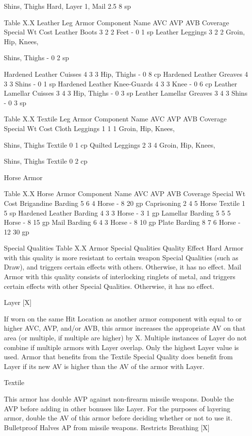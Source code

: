 \documentclass[oneside,11pt,english]{book}
\begin{document}
Shins, Thighs Hard, Layer 1, Mail 2.5 8 sp

Table X.X Leather Leg Armor
Component Name AVC AVP AVB Coverage Special Wt Cost
Leather Boots 3 2 2 Feet - 0 1 sp
Leather Leggings 3 2 2 Groin, Hip, Knees, 

Shins, Thighs - 0 2 sp

Hardened Leather 
Cuisses 4 3 3 Hip, Thighs - 0 8 cp
Hardened Leather 
Greaves 4 3 3 Shins - 0 1 sp
Hardened Leather 
Knee-Guards 4 3 3 Knee - 0 6 cp
Leather Lamellar 
Cuisses 3 4 3 Hip, Thighs - 0 3 sp
Leather Lamellar 
Greaves 3 4 3 Shins - 0 3 sp

Table X.X Textile Leg Armor
Component Name AVC AVP AVB Coverage Special Wt Cost
Cloth Leggings 1 1 1 Groin, Hip, Knees, 

Shins, Thighs Textile 0 1 cp
Quilted Leggings 2 3 4 Groin, Hip, Knees, 

Shins, Thighs Textile 0 2 cp

Horse Armor


Table X.X Horse Armor
Component Name AVC AVP AVB Coverage Special Wt Cost
Brigandine 
Barding 5 6 4 Horse - 8 20 gp
Caprisoning 2 4 5 Horse Textile 1 5 sp
Hardened Leather 
Barding 4 3 3 Horse - 3 1 gp
Lamellar Barding 5 5 5 Horse - 8 15 gp
Mail Barding 6 4 3 Horse - 8 10 gp
Plate Barding 8 7 6 Horse - 12 30 gp

Special Qualities
Table X.X Armor Special Qualities
Quality Effect
Hard Armor with this quality is more resistant to certain weapon Special Qualities (such as Draw), and 
triggers certain effects with others. Otherwise, it has no effect.
Mail Armor with this quality consists of interlocking ringlets of metal, and triggers certain effects with 
other Special Qualities. Otherwise, it has no effect.

Layer [X]

If worn on the same Hit Location as another armor component with equal to or higher AVC, AVP, 
and/or AVB, this armor increases the appropriate AV on that area (or multiple, if multiple are 
higher) by X. Multiple instances of Layer do not combine if multiple armors with Layer overlap. 
Only the highest Layer value is used. Armor that benefits from the Textile Special Quality does 
benefit from Layer if its new AV is higher than the AV of the armor with Layer.

Textile

This armor has double AVP against non-firearm missile weapons. Double the AVP before adding in
other bonuses like Layer. For the purposes of layering armor, double the AV of this armor before 
deciding whether or not to use it.
Bulletproof Halves AP from missile weapons.
Restricts 
Breathing [X]
\end{document}
